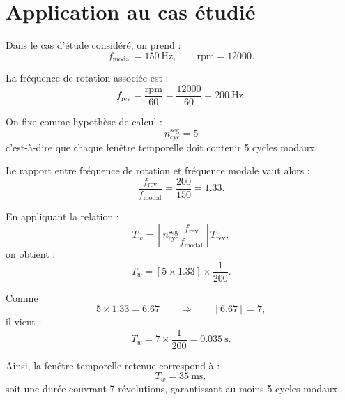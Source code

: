 \documentclass[12pt,a4paper, openany]{book}
\begin{document}

\section{Application au cas étudié}

Dans le cas d’étude considéré, on prend :
\begin{equation}
f_{\mathrm{modal}} = 150~\mathrm{Hz},
\qquad
\mathrm{rpm} = 12000.
\end{equation}

La fréquence de rotation associée est :
\begin{equation}
f_{\mathrm{rev}}=\frac{\mathrm{rpm}}{60}
=\frac{12000}{60}
=200~\mathrm{Hz}.
\end{equation}

On fixe comme hypothèse de calcul :
\begin{equation}
n_{\mathrm{cyc}}^{\mathrm{seg}} = 5
\end{equation}
c’est-à-dire que chaque fenêtre temporelle doit contenir 5 cycles modaux.

Le rapport entre fréquence de rotation et fréquence modale vaut alors :
\begin{equation}
\frac{f_{\mathrm{rev}}}{f_{\mathrm{modal}}}
=
\frac{200}{150}
=
1.33.
\end{equation}

En appliquant la relation :
\begin{equation}
T_w
=
\left\lceil
n_{\mathrm{cyc}}^{\mathrm{seg}}
\frac{f_{\mathrm{rev}}}{f_{\mathrm{modal}}}
\right\rceil
T_{\mathrm{rev}},
\end{equation}
on obtient :
\begin{equation}
T_w
=
\left\lceil
5\times1.33
\right\rceil
\times
\frac{1}{200}.
\end{equation}

Comme
\begin{equation}
5\times1.33 = 6.67
\qquad\Rightarrow\qquad
\left\lceil 6.67 \right\rceil = 7,
\end{equation}
il vient :
\begin{equation}
T_w = 7\times \frac{1}{200}
= 0.035~\mathrm{s}.
\end{equation}

Ainsi, la fenêtre temporelle retenue correspond à :
\begin{equation}
T_w = 35~\mathrm{ms},
\end{equation}
soit une durée couvrant 7 révolutions, garantissant au moins 5 cycles modaux.
\end{document}
